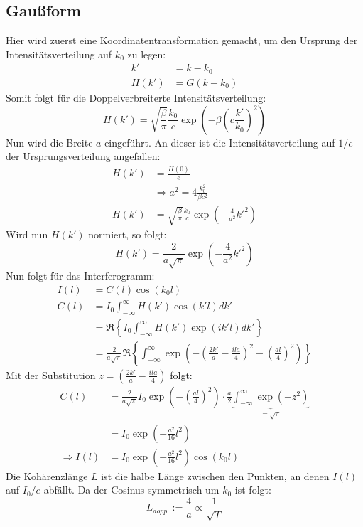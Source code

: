 \subsection{Gaußform}
Hier wird zuerst eine Koordinatentransformation gemacht, um den Ursprung der Intensitätsverteilung auf $k_0$ zu legen:
\begin{align}
    k'&=k-k_0\\
    H(k')&=G(k-k_0)
\end{align}
Somit folgt für die Doppelverbreiterte Intensitätsverteilung:
\begin{equation}
    H(k')=\sqrt{\frac{\beta}{\pi}}\frac{k_0}{c}\exp\left(-\beta\left(c\frac{k'}{k_0}\right)^2\right)
\end{equation}
Nun wird die Breite $a$ eingeführt. An dieser ist die Intensitätsverteilung auf $1/e$ der Ursprungsverteilung angefallen:
\begin{align}
    H(k')&=\frac{H(0)}{e}\\
    &\Rightarrow a^2=4\frac{k_0^2}{\beta c^2}\\
    H(k')&=\sqrt{\frac{\beta}{\pi}}\frac{k_0}{c}\exp\left(-\frac{4}{a^2}k'^2\right)
\end{align}
Wird nun $H(k')$ normiert, so folgt:
\begin{equation}
    H(k')=\frac{2}{a\sqrt{\pi}}\exp\left(-\frac{4}{a^2}k'^2\right)
\end{equation}
Nun folgt für das Interferogramm:
\begin{align}
    I(l)&=C(l)\cos\left(k_0l\right)\\
    C(l)&=I_0\int_{-\infty}^\infty H(k')\cos(k'l)dk'\\
    &=\Re\left\{I_0\int_{-\infty}^\infty H(k')\exp(ik'l)dk'\right\}\\
    &=\frac{2}{a\sqrt{\pi}}\Re\left\{\int_{-\infty}^\infty \exp\left(-\left(\frac{2k'}{a}-\frac{ila}{4}\right)^2-\left(\frac{al}{4}\right)^2\right)\right\}
\end{align}
Mit der Substitution $z=\left(\frac{2k'}{a}-\frac{ila}{4}\right)$ folgt:
\begin{align}
    C(l)&=\frac{2}{a\sqrt{\pi}}I_0\exp\left(-\left(\frac{al}{4}\right)^2\right)\cdot\frac{a}{2}\underbrace{\int_{-\infty}^\infty \exp\left(-z^2\right)}_{=\sqrt{\pi}}\\
    &=I_0\exp\left(-\frac{a^2}{16}l^2\right)\\
    \Rightarrow I(l)&=I_0\exp\left(-\frac{a^2}{16}l^2\right)\cos\left(k_0l\right)
\end{align}
Die Kohärenzlänge $L$ ist die halbe Länge zwischen den Punkten, an denen $I(l)$ auf $I_0/e$ abfällt.
Da der Cosinus symmetrisch um $k_0$ ist folgt:
\begin{equation}
    L_{dopp.}:=\frac{4}{a}\propto\frac{1}{\sqrt{T}}
\end{equation}
